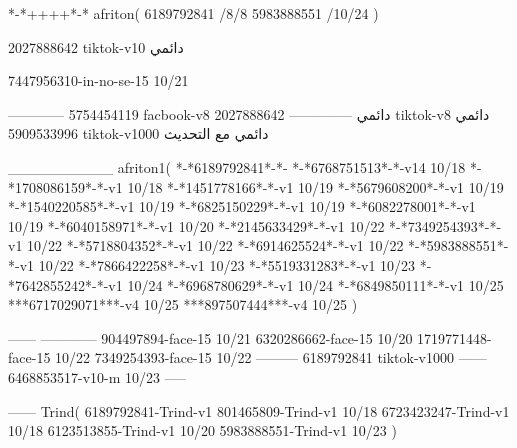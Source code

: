*-*++++*-*
afriton(
6189792841 /8/8
5983888551 /10/24
)

2027888642 tiktok-v10
دائمي


7447956310-in-no-se-15 10/21

------------
5754454119 facbook-v8
دائمي
--------------
2027888642 tiktok-v8
دائمي
5909533996 tiktok-v1000
دائمي مع التحديث

__________
afriton1(
*-*6189792841*-*-
*-*6768751513*-*-v14 10/18
*-*1708086159*-*-v1 10/18
*-*1451778166*-*-v1 10/19
*-*5679608200*-*-v1 10/19
*-*1540220585*-*-v1 10/19
*-*6825150229*-*-v1 10/19
*-*6082278001*-*-v1 10/19
*-*6040158971*-*-v1 10/20
*-*2145633429*-*-v1 10/22
*-*7349254393*-*-v1 10/22
*-*5718804352*-*-v1 10/22
*-*6914625524*-*-v1 10/22
*-*5983888551*-*-v1 10/22
*-*7866422258*-*-v1 10/23
*-*5519331283*-*-v1 10/23
*-*7642855242*-*-v1 10/24
*-*6968780629*-*-v1 10/24
*-*6849850111*-*-v1 10/25
***6717029071***-v4 10/25
***897507444***-v4 10/25
)

------
------------
904497894-face-15 10/21
6320286662-face-15 10/20
1719771448-face-15 10/22
7349254393-face-15 10/22
---------
6189792841 tiktok-v1000
------
6468853517-v10-m 10/23
-----

------
Trind(
6189792841-Trind-v1 
801465809-Trind-v1 10/18
6723423247-Trind-v1 10/18
6123513855-Trind-v1 10/20
5983888551-Trind-v1 10/23
)
